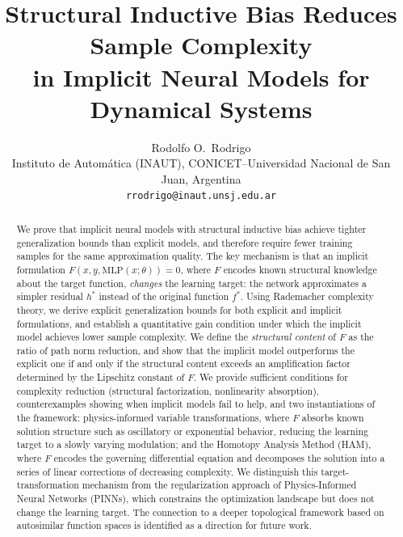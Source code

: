 \documentclass[12pt]{article}
\newcommand{\MLP}{\mathrm{MLP}}
\begin{document}
\title{Structural Inductive Bias Reduces Sample Complexity\\
in Implicit Neural Models for Dynamical Systems}

\author{Rodolfo O.\ Rodrigo\\[4pt]
  \small Instituto de Autom\'atica (INAUT),
  CONICET--Universidad Nacional de San Juan, Argentina\\
  \small \texttt{rrodrigo@inaut.unsj.edu.ar}}
\date{}
\maketitle

\begin{abstract}
We prove that implicit neural models with structural inductive bias
achieve tighter generalization bounds than explicit models, and
therefore require fewer training samples for the same approximation
quality.
The key mechanism is that an implicit formulation
$F(x, y, \MLP(x;\theta)) = 0$, where $F$ encodes known structural
knowledge about the target function, \emph{changes} the learning
target: the network approximates a simpler residual $h^*$ instead
of the original function $f^*$.
Using Rademacher complexity theory, we derive explicit generalization
bounds for both explicit and implicit formulations, and establish a
quantitative gain condition under which the implicit model achieves
lower sample complexity.
We define the \emph{structural content} of $F$ as the ratio of path
norm reduction, and show that the implicit model outperforms the
explicit one if and only if the structural content exceeds an
amplification factor determined by the Lipschitz constant of $F$.
We provide sufficient conditions for complexity reduction (structural
factorization, nonlinearity absorption), counterexamples showing
when implicit models fail to help, and two instantiations of the
framework:
physics-informed variable transformations, where $F$ absorbs known
solution structure such as oscillatory or exponential behavior,
reducing the learning target to a slowly varying modulation; and
the Homotopy Analysis Method (HAM), where $F$ encodes the governing
differential equation and decomposes the solution into a series of
linear corrections of decreasing complexity.
We distinguish this target-transformation mechanism from the
regularization approach of Physics-Informed Neural Networks (PINNs),
which constrains the optimization landscape but does not change the
learning target.
The connection to a deeper topological framework based on
autosimilar function spaces is identified as a direction for future
work.
\end{abstract}
\end{document}
